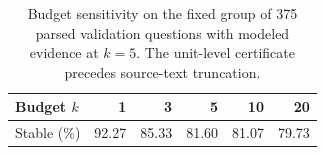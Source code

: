 \begin{table}[t]
\centering\small
\setlength{\tabcolsep}{4pt}
\begin{tabular}{@{}lrrrrr@{}}
\toprule
Budget $k$ & 1 & 3 & 5 & 10 & 20 \\
\midrule
Stable (\%) & 92.27 & 85.33 & 81.60 & 81.07 & 79.73 \\
\bottomrule
\end{tabular}
\caption{Budget sensitivity on the fixed group of 375 parsed validation questions with modeled evidence at $k=5$. The unit-level certificate precedes source-text truncation.}
\label{tab:budget}
\end{table}
